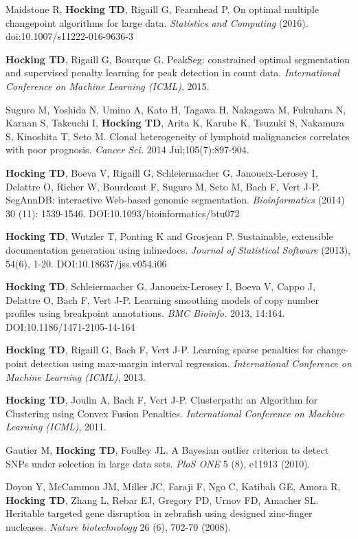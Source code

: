 \documentclass[margin,line]{res}
\begin{document}
\begin{resume}
Maidstone R, {\bf Hocking TD}, Rigaill G, Fearnhead P. On optimal
multiple changepoint algorithms for large data. {\it Statistics and
Computing} (2016). doi:10.1007/s11222-016-9636-3 

{\bf Hocking TD}, Rigaill G, Bourque G. PeakSeg: constrained optimal
segmentation and supervised penalty learning for peak detection in
count data. {\it International Conference on Machine Learning (ICML)},
2015.

Suguro M, Yoshida N, Umino A, Kato H, Tagawa H, Nakagawa M, Fukuhara
N, Karnan S, Takeuchi I, {\bf Hocking TD}, Arita K, Karube K, Tsuzuki
S, Nakamura S, Kinoshita T, Seto M. Clonal heterogeneity of lymphoid
malignancies correlates with poor prognosis. {\it Cancer Sci.} 2014
Jul;105(7):897-904.

{\bf Hocking TD}, Boeva V, Rigaill G, Schleiermacher G,
Janoueix-Lerosey I, Delattre O, Richer W, Bourdeaut F, Suguro M, Seto
M, Bach F, Vert J-P. SegAnnDB: interactive Web-based genomic
segmentation. {\it Bioinformatics} (2014) 30 (11):
1539-1546. DOI:10.1093/bioinformatics/btu072

{\bf Hocking TD}, Wutzler T, Ponting K and Grosjean P. Sustainable,
extensible documentation generation using inlinedocs. {\it Journal of
Statistical Software} (2013), 54(6), 1-20. DOI:10.18637/jss.v054.i06

{\bf Hocking TD}, Schleiermacher G, Janoueix-Lerosey I, Boeva V, Cappo
J, Delattre O, Bach F, Vert J-P. Learning smoothing models of copy
number profiles using breakpoint annotations. {\it BMC Bioinfo.} 2013,
14:164. DOI:10.1186/1471-2105-14-164

{\bf Hocking TD}, Rigaill G, Bach F, Vert J-P. Learning sparse
penalties for change-point detection using max-margin interval
regression. {\it International Conference on Machine Learning (ICML)}, 2013.

{\bf Hocking TD}, Joulin A, Bach F, Vert J-P. Clusterpath: an
Algorithm for Clustering using Convex Fusion Penalties. {\it International Conference on Machine Learning (ICML)}, 2011.

Gautier M, {\bf Hocking TD}, Foulley JL. A Bayesian outlier criterion
to detect SNPs under selection in large data sets. {\it PloS ONE} 5
(8), e11913 (2010).

Doyon Y, McCammon JM, Miller JC, Faraji F, Ngo C, Katibah GE, Amora R,
{\bf Hocking TD}, Zhang L, Rebar EJ, Gregory PD, Urnov FD, Amacher
SL. Heritable targeted gene disruption in zebrafish using designed
zinc-finger nucleases. {\it Nature biotechnology} 26 (6), 702-70
(2008).


\end{resume}
\end{document}
